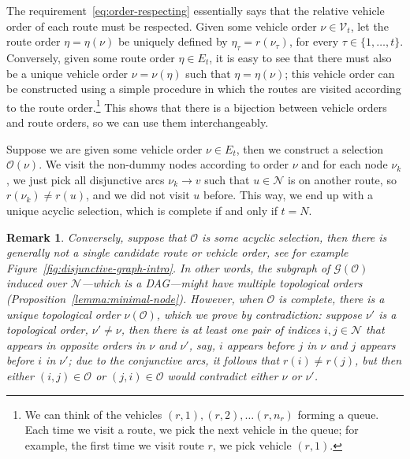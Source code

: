 \documentclass[a4paper]{report}
\theoremstyle{definition}
\theoremstyle{plain}
\newtheorem{remarknum}{Remark}[chapter]
\begin{document}
The requirement~\eqref{eq:order-respecting} essentially says that the relative
vehicle order of each route must be respected.
%
Given some vehicle order $\nu \in \mathcal{V}_t$, let the route order
$\eta = \eta(\nu)$ be uniquely defined by $\eta_\tau = r(\nu_\tau)$, for every
$\tau \in \{ 1, \dots, t \}$.
%
Conversely, given some route order $\eta \in E_t$, it is easy to see that there must
also be a unique vehicle order $\nu = \nu(\eta)$ such that $\eta = \eta(\nu)$; this
vehicle order can be constructed using a simple procedure in which the routes
are visited according to the route order.\footnote{We can think of the vehicles
  $(r,1), (r,2), \dots (r,n_r)$ forming a queue. Each time we visit a route, we
  pick the next vehicle in the queue; for example, the first time we visit route
  $r$, we pick vehicle $(r, 1)$.}
%
This shows that there is a bijection between vehicle orders and route orders, so
we can use them interchangeably.

Suppose we are given some vehicle order $\nu \in E_t$, then we construct a
selection $\mathcal{O}(\nu)$.
%
We visit the non-dummy nodes according to order $\nu$ and for each node $\nu_k$,
we just pick all disjunctive arcs $\nu_k \rightarrow v$ such that
$u \in \mathcal{N}$ is on another route, so $r(\nu_k) \neq r(u)$, and we did not
visit $u$ before.
%
This way, we end up with a unique acyclic selection, which is complete if and
only if $t = N$.

\begin{remarknum}\label{rem:partial-order}
Conversely, suppose that $\mathcal{O}$ is some acyclic selection, then there is
generally not a single candidate route or vehicle order, see for example
Figure~\ref{fig:disjunctive-graph-intro}.
%
In other words, the subgraph of $\mathcal{G}(\mathcal{O})$ induced over
$\mathcal{N}$---which is a DAG---might have multiple topological orders
(Proposition~\ref{lemma:minimal-node}).
%
However, when $\mathcal{O}$ is complete, there is a unique topological order
$\nu(\mathcal{O})$, which we prove by contradiction: suppose $\nu'$ is a
topological order, $\nu' \neq \nu$, then there is at least one pair of indices
$i,j \in \mathcal{N}$ that appears in opposite orders in $\nu$ and $\nu'$, say,
$i$ appears before $j$ in $\nu$ and $j$ appears before $i$ in $\nu'$; due to the
conjunctive arcs, it follows that $r(i) \neq r(j)$, but then either
$(i,j) \in \mathcal{O}$ or $(j,i) \in \mathcal{O}$ would contradict either $\nu$
or $\nu'$.
\end{remarknum}
\end{document}
